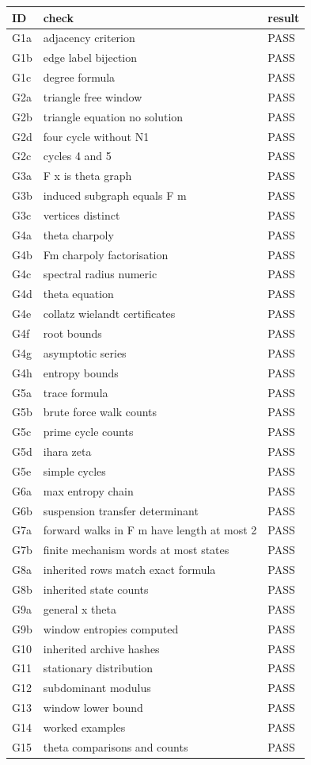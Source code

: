 \begin{longtable}{lp{}l}\toprule ID & check & result\\\midrule\endhead
G1a & adjacency criterion & PASS\\
G1b & edge label bijection & PASS\\
G1c & degree formula & PASS\\
G2a & triangle free window & PASS\\
G2b & triangle equation no solution & PASS\\
G2d & four cycle without N1 & PASS\\
G2c & cycles 4 and 5 & PASS\\
G3a & F x is theta graph & PASS\\
G3b & induced subgraph equals F m & PASS\\
G3c & vertices distinct & PASS\\
G4a & theta charpoly & PASS\\
G4b & Fm charpoly factorisation & PASS\\
G4c & spectral radius numeric & PASS\\
G4d & theta equation & PASS\\
G4e & collatz wielandt certificates & PASS\\
G4f & root bounds & PASS\\
G4g & asymptotic series & PASS\\
G4h & entropy bounds & PASS\\
G5a & trace formula & PASS\\
G5b & brute force walk counts & PASS\\
G5c & prime cycle counts & PASS\\
G5d & ihara zeta & PASS\\
G5e & simple cycles & PASS\\
G6a & max entropy chain & PASS\\
G6b & suspension transfer determinant & PASS\\
G7a & forward walks in F m have length at most 2 & PASS\\
G7b & finite mechanism words at most states & PASS\\
G8a & inherited rows match exact formula & PASS\\
G8b & inherited state counts & PASS\\
G9a & general x theta & PASS\\
G9b & window entropies computed & PASS\\
G10 & inherited archive hashes & PASS\\
G11 & stationary distribution & PASS\\
G12 & subdominant modulus & PASS\\
G13 & window lower bound & PASS\\
G14 & worked examples & PASS\\
G15 & theta comparisons and counts & PASS\\
\bottomrule\end{longtable}
